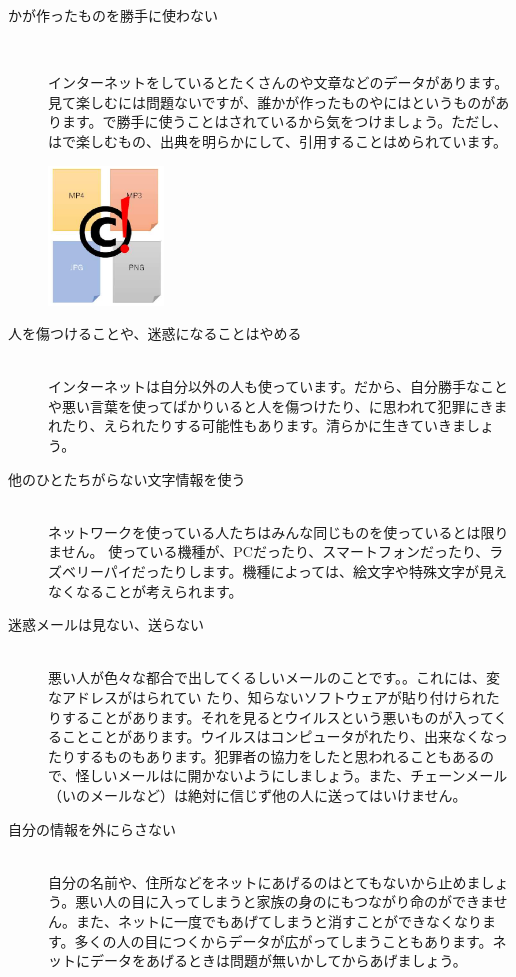 \documentclass[a4paper,12pt,dvipdfmx]{jarticle}
\begin{document}
\begin{description}


	\item[かが作ったものを勝手に使わない]~\\
	\begin{minipage}[b]{0.6\textwidth}
		インターネットをしているとたくさんのや文章などのデータがあります。見て楽しむには問題ないですが、誰かが作ったものやにはというものがあります。で勝手に使うことはされているから気をつけましょう。ただし、はで楽しむもの、出典を明らかにして、引用することはめられています。
	\end{minipage}\hfill
	\includegraphics[width=0.25\textwidth]{ome7-img001}
	\item[人を傷つけることや、迷惑になることはやめる]~\\
	インターネットは自分以外の人も使っています。だから、自分勝手なことや悪い言葉を使ってばかりいると人を傷つけたり、に思われて犯罪にきまれたり、えられたりする可能性もあります。清らかに生きていきましょう。
	\item[他のひとたちがらない文字情報を使う]~\\
	ネットワークを使っている人たちはみんな同じものを使っているとは限りません。
	使っている機種が、PCだったり、スマートフォンだったり、ラズベリーパイだったりします。機種によっては、絵文字や特殊文字が見えなくなることが考えられます。
	\item[迷惑メールは見ない、送らない]~\\
	悪い人が色々な都合で出してくるしいメールのことです。。これには、変なアドレスがはられてい
	たり、知らないソフトウェアが貼り付けられたりすることがあります。それを見るとウイルスという悪いものが入ってくることことがあります。ウイルスはコンピュータがれたり、出来なくなったりするものもあります。犯罪者の協力をしたと思われることもあるので、怪しいメールはに開かないようにしましょう。また、チェーンメール（いのメールなど）は絶対に信じず他の人に送ってはいけません。
	\item[自分の情報を外にらさない]~\\
	自分の名前や、住所などをネットにあげるのはとてもないから止めましょう。悪い人の目に入ってしまうと家族の身のにもつながり命のができません。また、ネットに一度でもあげてしまうと消すことができなくなります。多くの人の目につくからデータが広がってしまうこともあります。ネットにデータをあげるときは問題が無いかしてからあげましょう。


\end{description}
\end{document}
